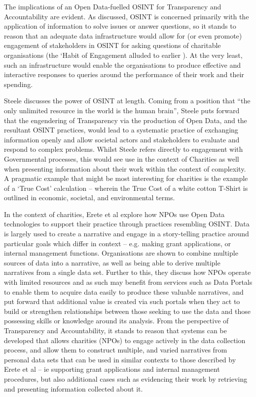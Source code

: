 The implications of an Open Data-fuelled OSINT for Transparency and Accountability are evident. As discussed, OSINT is concerned primarily with the application of information to solve issues or answer questions, so it stands to reason that an adequate data infrastructure would allow for (or even promote) engagement of stakeholders in OSINT for asking questions of charitable organisations (the `Habit of Engagement alluded to earlier \cite{gordon_making_2013-1}). At the very least, such an infrastructure would enable the organisations to produce effective and interactive responses to queries around the performance of their work and their spending. 

Steele discusses the power of OSINT at length. Coming from a position that ``the only unlimited resource in the world is the human brain'', Steele puts forward that the engendering of Transparency via the production of Open Data, and the resultant OSINT practices, would lead to a systematic practice of exchanging information openly and allow societal actors and stakeholders to evaluate and respond to complex problems. Whilst Steele refers directly to engagement with Governmental processes, this would see use in the context of Charities as well when presenting information about their work within the context of complexity. A pragmatic example that might be most interesting for charities is the example of a `True Cost' calculation --  wherein the True Cost of a white cotton T-Shirt is outlined in economic, societal, and environmental terms.

In the context of charities, Erete et al explore how NPOs use Open Data technologies to support their practice through practices resembling OSINT. Data is largely used to create a narrative and engage in a story-telling practice around particular goals which differ in context -- e.g. making grant applications, or internal management functions. Organisations are shown to combine multiple sources of data into a narrative, as well as being able to derive multiple narratives from a single data set. Further to this, they discuss how NPOs operate with limited resources and as such may benefit from services such as Data Portals to enable them to acquire data easily to produce these valuable narratives, and put forward that additional value is created via such portals when they act to build or strengthen relationships between those seeking to use the data and those possessing skills or knowledge around its analysis. From the perspective of Transparency and Accountability, it stands to reason that systems can be developed that allows charities (NPOs) to engage actively in the data collection process, and allow them to construct multiple, and varied narratives from personal data sets that can be used in similar contexts to those described by Erete et al -- ie supporting grant applications and internal management procedures, but also additional cases such as evidencing their work by retrieving and presenting information collected about it.

